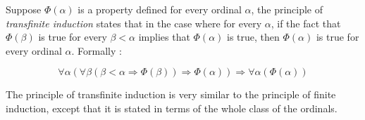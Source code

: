 \documentclass[12pt]{article}
\newcommand{\Implies}{\Rightarrow}
\begin{document}
Suppose $\Phi(\alpha)$ is a property defined for every ordinal $\alpha$, the principle of \emph{transfinite induction} states that in the case where for every $\alpha$, if the fact that $\Phi(\beta)$ is true for every $\beta<\alpha$ implies that $\Phi(\alpha)$ is true, then $\Phi(\alpha)$ is true for every ordinal $\alpha$.  Formally :

\begin{displaymath}
\forall\alpha(\forall\beta(\beta<\alpha\Implies\Phi(\beta))\Implies\Phi(\alpha))\Implies\forall\alpha(\Phi(\alpha))
\end{displaymath}

The principle of transfinite induction is very similar to the principle of finite induction, except that it is stated in terms of the whole class of the ordinals.
\end{document}
